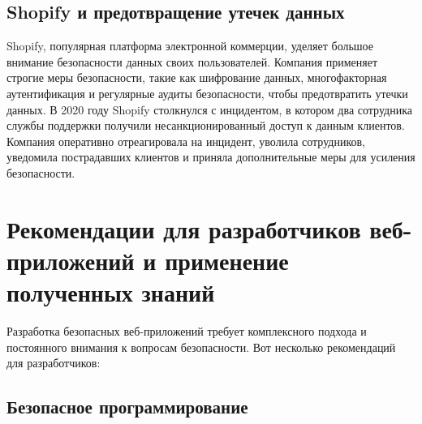 \documentclass[a4paper,12pt]{diplom}
\begin{document}
	 \subsection{Shopify и предотвращение утечек данных}
	 
	 Shopify, популярная платформа электронной коммерции, уделяет большое внимание безопасности данных своих пользователей.  Компания применяет строгие меры безопасности, такие как шифрование данных, многофакторная аутентификация и регулярные аудиты безопасности, чтобы предотвратить утечки данных.  В 2020 году Shopify столкнулся с инцидентом, в котором два сотрудника службы поддержки получили несанкционированный доступ к данным клиентов.  Компания оперативно отреагировала на инцидент, уволила сотрудников, уведомила пострадавших клиентов и приняла дополнительные меры для усиления безопасности.\cite{Shopify_anti_attack}
	 
	 
	 
	 
	 		
	 
	 
	 
	 
	 
	 
	 \section{Рекомендации для разработчиков веб-приложений и применение полученных знаний}
	 
	 Разработка безопасных веб-приложений требует комплексного подхода и постоянного внимания к вопросам безопасности. Вот несколько рекомендаций для разработчиков:
	 
	 \subsection{Безопасное программирование}
	 
\end{document}
